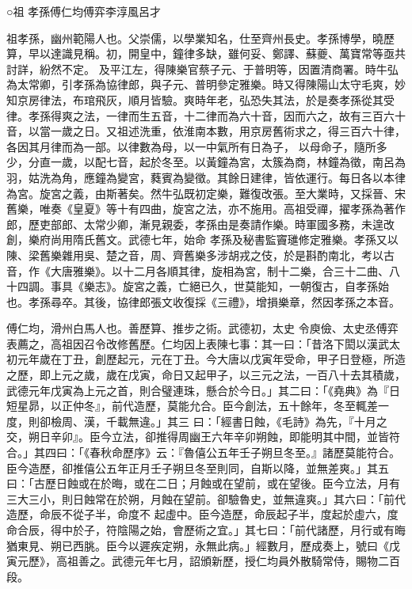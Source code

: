 
\begin{pinyinscope}

 ○祖
 孝孫傅仁均傅弈李淳風呂才



 祖孝孫，幽州範陽人也。父崇儒，以學業知名，仕至齊州長史。孝孫博學，曉歷算，早以達識見稱。初，開皇中，鐘律多缺，雖何妥、鄭譯、蘇夔、萬寶常等亟共討詳，紛然不定。
 及平江左，得陳樂官蔡子元、于普明等，因置清商署。時牛弘為太常卿，引孝孫為協律郎，與子元、普明參定雅樂。時又得陳陽山太守毛爽，妙知京房律法，布琯飛灰，順月皆驗。爽時年老，弘恐失其法，於是奏孝孫從其受律。孝孫得爽之法，一律而生五音，十二律而為六十音，因而六之，故有三百六十音，以當一歲之日。又祖述洗重，依淮南本數，用京房舊術求之，得三百六十律，各因其月律而為一部。以律數為母，以一中氣所有日為子，
 以母命子，隨所多少，分直一歲，以配七音，起於冬至。以黃鐘為宮，太簇為商，林鐘為徵，南呂為羽，姑洗為角，應鐘為變宮，蕤賓為變徵。其餘日建律，皆依運行。每日各以本律為宮。旋宮之義，由斯著矣。然牛弘既初定樂，難復改張。至大業時，又採晉、宋舊樂，唯奏《皇夏》等十有四曲，旋宮之法，亦不施用。高祖受禪，擢孝孫為著作郎，歷吏部郎、太常少卿，漸見親委，孝孫由是奏請作樂。時軍國多務，未遑改創，樂府尚用隋氏舊文。武德七年，始命
 孝孫及秘書監竇璡修定雅樂。孝孫又以陳、梁舊樂雜用吳、楚之音，周、齊舊樂多涉胡戎之伎，於是斟酌南北，考以古音，作《大唐雅樂》。以十二月各順其律，旋相為宮，制十二樂，合三十二曲、八十四調。事具《樂志》。旋宮之義，亡絕已久，世莫能知，一朝復古，自孝孫始也。孝孫尋卒。其後，協律郎張文收復採《三禮》，增損樂章，然因孝孫之本音。



 傅仁均，滑州白馬人也。善歷算、推步之術。武德初，太史
 令庾儉、太史丞傅弈表薦之，高祖因召令改修舊歷。仁均因上表陳七事：其一曰：「昔洛下閎以漢武太初元年歲在丁丑，創歷起元，元在丁丑。今大唐以戊寅年受命，甲子日登極，所造之歷，即上元之歲，歲在戊寅，命日又起甲子，以三元之法，一百八十去其積歲，武德元年戊寅為上元之首，則合璧連珠，懸合於今日。」其二曰：「《堯典》為『日短星昴，以正仲冬』，前代造歷，莫能允合。臣今創法，五十餘年，冬至輒差一度，則卻檢周、漢，千載無違。」其三
 曰：「經書日蝕，《毛詩》為先，『十月之交，朔日辛卯』。臣今立法，卻推得周幽王六年辛卯朔蝕，即能明其中間，並皆符合。」其四曰：「《春秋命歷序》云：『魯僖公五年壬子朔旦冬至。』諸歷莫能符合。臣今造歷，卻推僖公五年正月壬子朔旦冬至則同，自斯以降，並無差爽。」其五曰：「古歷日蝕或在於晦，或在二日；月蝕或在望前，或在望後。臣今立法，月有三大三小，則日蝕常在於朔，月蝕在望前。卻驗魯史，並無違爽。」其六曰：「前代造歷，命辰不從子半，命度不
 起虛中。臣今造歷，命辰起子半，度起於虛六，度命合辰，得中於子，符陰陽之始，會歷術之宜。」其七曰：「前代諸歷，月行或有晦猶東見、朔已西朓。臣今以遲疾定朔，永無此病。」經數月，歷成奏上，號曰《戊寅元歷》，高祖善之。武德元年七月，詔頒新歷，授仁均員外散騎常侍，賜物二百段。




\end{pinyinscope}
